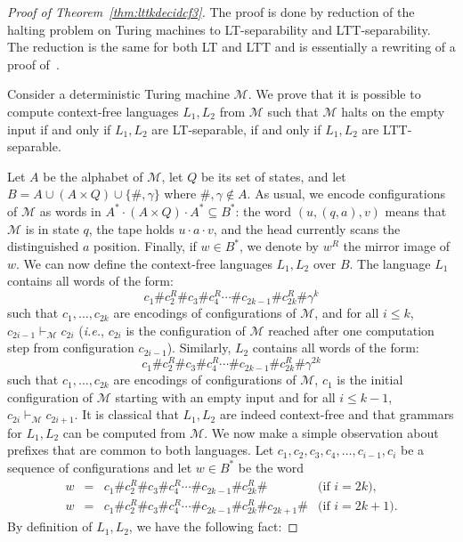 \documentclass{LMCS}
\newcommand{\lt}{\textup{LT}\xspace}
\newcommand{\ltt}{\textup{LTT}\xspace}
\let\leq\leqslant
\theoremstyle{plain}
\begin{document}
\begin{proof}[Proof of Theorem~\ref{thm:lttkdecidcf3}]
  The proof is done by reduction of the halting problem on Turing
  machines to \lt-separability and \ltt-separability. The reduction is
  the same for both \lt and \ltt and is essentially a rewriting of a
  proof of~\cite{szygram}.

  Consider a deterministic Turing machine $\mathcal{M}$. We prove that it is
  possible to compute context-free languages $L_1,L_2$ from $\mathcal{M}$ such
  that $\mathcal{M}$ halts on the empty input if and only if $L_1,L_2$ are
  \lt-separable, if and only if $L_1,L_2$ are \ltt-separable.

  Let $A$ be the alphabet of $\mathcal{M}$, let $Q$ be its set of
  states, and let $B=A \cup (A \times Q) \cup \{\#,\gamma\}$ where
  $\#,\gamma \not\in A$. As usual, we encode configurations of
  $\mathcal{M}$ as words in $A^{*} \cdot (A \times Q) \cdot A^{*}
  \subseteq B^*$: the word $(u,(q,a),v)$ means that $\mathcal{M}$ is
  in state $q$, the tape holds $u\cdot a\cdot v$, and the head
  currently scans the distinguished $a$ position. Finally, if $w \in
  B^*$, we denote by $w^{R}$ the mirror image of $w$. We can now
  define the context-free languages $L_1,L_2$ over $B$. The language $L_1$
  contains all words of the form:
  \[
  c^{}_1\#c_2^{R}\#c^{}_3\#c_4^R \cdots \#c^{}_{2k-1}\#c_{2k}^R \# \gamma^k
  \]
  such that $c_1,\dots,c_{2k}$ are encodings of configurations of $\mathcal{M}$,
  and for all $i \leq k$, $c_{2i-1}\vdash_{\mathcal{M}} c_{2i}$ (\emph{i.e.},
  $c_{2i}$ is the configuration of $\mathcal{M}$ reached after one computation
  step from configuration $c_{2i-1}$). Similarly, $L_2$ contains all
  words of the form:
  \[
  c^{}_1\#c_2^{R}\#c^{}_3\#c_4^R \cdots \#c^{}_{2k-1}\#c_{2k}^R \# \gamma^{2k}
  \]
  such that $c_1,\dots,c_{2k}$ are encodings of configurations of
  $\mathcal{M}$, $c_1$ is the initial configuration of $\mathcal{M}$
  starting with an empty input and for all $i \leq k-1$,
  $c_{2i}\vdash_{\mathcal{M}}c_{2i+1}$. It is classical that $L_1,L_2$
  are indeed context-free and that grammars for $L_1,L_2$ can be
  computed from $\mathcal{M}$. We now make a simple observation about
  prefixes that are common to both languages. Let
  $c_1,c_2,c_3,c_4,\ldots,c_{i-1},c_{i}$ be a sequence of
  configurations and let $w\in B^{*}$ be the word
  \[
  \begin{array}{lcll}
    w & = & c^{}_1\#c_2^{R}\#c^{}_3\#c_4^R \cdots \#c^{}_{2k-1}\#c_{2k}^R\#
    & \text{(if $i=2k$),} \\[.8ex]
    w & = & c^{}_1\#c_2^{R}\#c^{}_3\#c_4^R \cdots
    \#c^{}_{2k-1}\#c_{2k}^{R}\#c^{}_{2k+1}\# & \text{(if $i=2k+1$).}
  \end{array}
  \]
  By definition of $L_1,L_2$, we have the following fact:


\end{proof}
\end{document}
